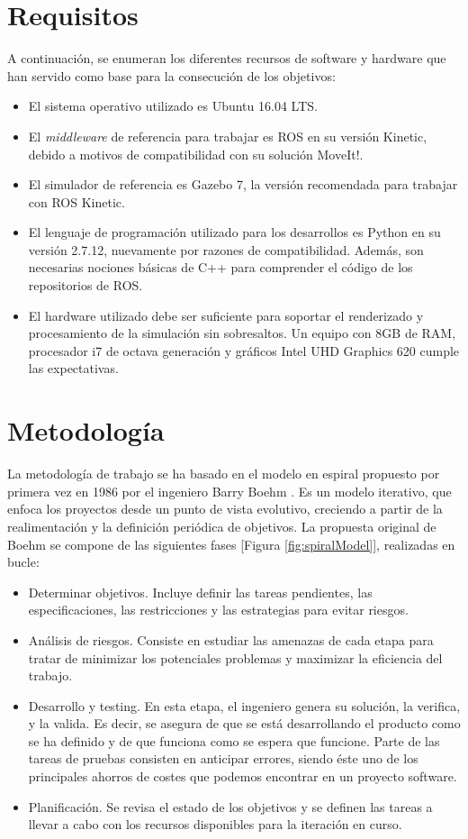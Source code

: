 \documentclass[12pt,spanish,chapterprefix, numbers=noenddot]{book}
\numberwithin{equation}{section}
\numberwithin{figure}{section}
\begin{document}
\section{Requisitos}
A continuación, se enumeran los diferentes recursos de software y hardware que han servido como base para la consecución de los objetivos: 
\begin{itemize}
    \item El sistema operativo utilizado es Ubuntu 16.04 LTS.
    \item El \textit{middleware} de referencia para trabajar es ROS en su versión Kinetic, debido a motivos de compatibilidad con su solución MoveIt!.
    \item El simulador de referencia es Gazebo 7, la versión recomendada para trabajar con ROS Kinetic. 
    \item El lenguaje de programación utilizado para los desarrollos es Python en su versión 2.7.12, nuevamente por razones de compatibilidad. Además, son necesarias nociones básicas de C++ para comprender el código de los repositorios de ROS. 
    \item El hardware utilizado debe ser suficiente para soportar el renderizado y procesamiento de la simulación sin sobresaltos. Un equipo con 8GB de RAM, procesador i7 de octava generación y gráficos Intel UHD Graphics 620 cumple las expectativas.
\end{itemize}

\section{Metodología}
La metodología de trabajo se ha basado en el modelo en espiral propuesto por primera vez en 1986 por el ingeniero Barry Boehm \cite{boehm}. Es un modelo iterativo, que enfoca los proyectos desde un punto de vista evolutivo, creciendo a partir de la realimentación y la definición periódica de objetivos. 
La propuesta original de Boehm se compone de las siguientes fases [Figura \ref{fig:spiralModel}], realizadas en bucle: 
\begin{itemize}
    \item Determinar objetivos. Incluye definir las tareas pendientes, las especificaciones, las restricciones y las estrategias para evitar riesgos.
    \item Análisis de riesgos. Consiste en estudiar las amenazas de cada etapa para tratar de minimizar los potenciales problemas y maximizar la eficiencia del trabajo. 
    \item Desarrollo y testing. En esta etapa, el ingeniero genera su solución, la verifica, y la valida. Es decir, se asegura de que se está desarrollando el producto como se ha definido y de que funciona como se espera que funcione. Parte de las tareas de pruebas consisten en anticipar errores, siendo éste uno de los principales ahorros de costes \cite{ibm_costs} \cite{inc_costs} que podemos encontrar en un proyecto software. 
    \item Planificación. Se revisa el estado de los objetivos y se definen las tareas a llevar a cabo con los recursos disponibles para la iteración en curso.  
\end{itemize}
\end{document}
